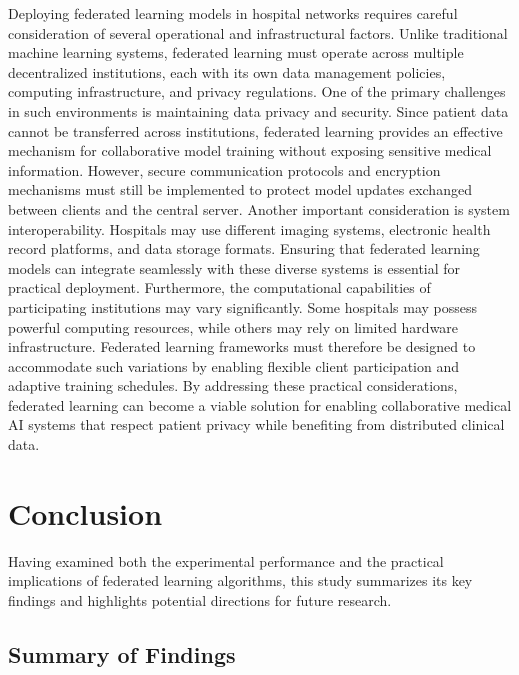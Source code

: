 \documentclass[12pt]{book}
\begin{document}
Deploying federated learning models in hospital networks requires careful consideration of several operational and infrastructural factors. Unlike traditional machine learning systems, federated learning must operate across multiple decentralized institutions, each with its own data management policies, computing infrastructure, and privacy regulations.
One of the primary challenges in such environments is maintaining data privacy and security. Since patient data cannot be transferred across institutions, federated learning provides an effective mechanism for collaborative model training without exposing sensitive medical information. However, secure communication protocols and encryption mechanisms must still be implemented to protect model updates exchanged between clients and the central server.
Another important consideration is system interoperability. Hospitals may use different imaging systems, electronic health record platforms, and data storage formats. Ensuring that federated learning models can integrate seamlessly with these diverse systems is essential for practical deployment.
Furthermore, the computational capabilities of participating institutions may vary significantly. Some hospitals may possess powerful computing resources, while others may rely on limited hardware infrastructure. Federated learning frameworks must therefore be designed to accommodate such variations by enabling flexible client participation and adaptive training schedules.
By addressing these practical considerations, federated learning can become a viable solution for enabling collaborative medical AI systems that respect patient privacy while benefiting from distributed clinical data.

\chapter{Conclusion}
Having examined both the experimental performance and the practical implications of federated learning algorithms, this study summarizes its key findings and highlights potential directions for future research.

\section{Summary of Findings}
\end{document}
